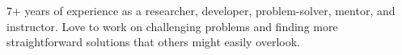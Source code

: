 

\begin{cvparagraph}

7+ years of experience as a researcher, developer, problem-solver, mentor, and instructor. Love to work on challenging problems and finding more straightforward solutions that others might easily overlook.
\end{cvparagraph}

